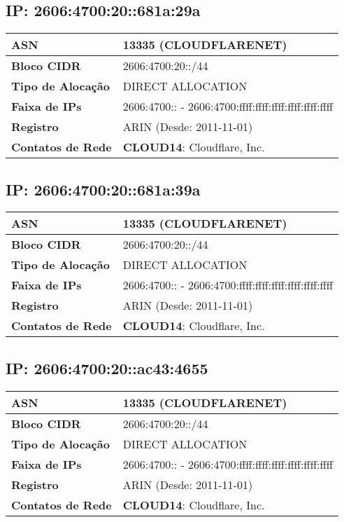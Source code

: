     \subsection{IP: 2606:4700:20::681a:29a}
    \begin{tabular}{|l|l|}
    \hline
    \textbf{ASN} & 13335 (CLOUDFLARENET) \\ \hline
    \textbf{Bloco CIDR} & 2606:4700:20::/44 \\ \hline
    \textbf{Tipo de Alocação} & DIRECT ALLOCATION \\ \hline
    \textbf{Faixa de IPs} & 2606:4700:: - 2606:4700:ffff:ffff:ffff:ffff:ffff:ffff \\ \hline
    \textbf{Registro} & ARIN (Desde: 2011-11-01) \\ \hline
        
\textbf{Contatos de Rede} & \textbf{CLOUD14}: Cloudflare, Inc. 
\\ \hline
\end{tabular}


    \subsection{IP: 2606:4700:20::681a:39a}
    \begin{tabular}{|l|l|}
    \hline
    \textbf{ASN} & 13335 (CLOUDFLARENET) \\ \hline
    \textbf{Bloco CIDR} & 2606:4700:20::/44 \\ \hline
    \textbf{Tipo de Alocação} & DIRECT ALLOCATION \\ \hline
    \textbf{Faixa de IPs} & 2606:4700:: - 2606:4700:ffff:ffff:ffff:ffff:ffff:ffff \\ \hline
    \textbf{Registro} & ARIN (Desde: 2011-11-01) \\ \hline
        
\textbf{Contatos de Rede} & \textbf{CLOUD14}: Cloudflare, Inc. 
\\ \hline
\end{tabular}


    \subsection{IP: 2606:4700:20::ac43:4655}
    \begin{tabular}{|l|l|}
    \hline
    \textbf{ASN} & 13335 (CLOUDFLARENET) \\ \hline
    \textbf{Bloco CIDR} & 2606:4700:20::/44 \\ \hline
    \textbf{Tipo de Alocação} & DIRECT ALLOCATION \\ \hline
    \textbf{Faixa de IPs} & 2606:4700:: - 2606:4700:ffff:ffff:ffff:ffff:ffff:ffff \\ \hline
    \textbf{Registro} & ARIN (Desde: 2011-11-01) \\ \hline
        
\textbf{Contatos de Rede} & \textbf{CLOUD14}: Cloudflare, Inc. 
\\ \hline
\end{tabular}


